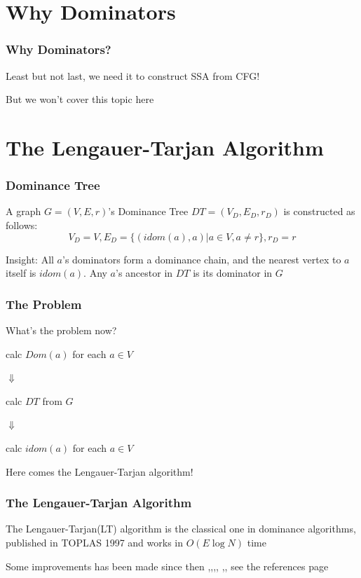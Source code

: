 \documentclass[]{beamer}
\begin{document}
\section{Why Dominators}
\frame{\tableofcontents[currentsection]}

\begin{frame}
  \frametitle{Why Dominators?}
  \centerline{\Large Least but not last, we need it to construct SSA from CFG!}

  \vspace{2em}\pause
  But we won't cover this topic here
\end{frame}

\section{The Lengauer-Tarjan Algorithm}
\frame{\tableofcontents[currentsection]}

\begin{frame}
  \frametitle{Dominance Tree}
  \begin{definition}
    A graph $G=(V, E, r)$'s \alert{Dominance Tree } $DT=(V_D, E_D, r_D)$ is constructed as follows:
    $$V_D=V, E_D=\{ (idom(a), a) | a \in V, a \neq r \}, r_D=r$$
  \end{definition}

  \pause
  Insight: All $a$'s dominators form a dominance chain, and the nearest vertex to $a$ itself is $idom(a)$.
  Any $a$'s ancestor in $DT$ is its dominator in $G$
\end{frame}

\begin{frame}
  \frametitle{The Problem}
  What's the problem now?

  \vspace{1em}\pause
  \centerline{calc $Dom(a)$ for each $a \in V$}
  \centerline{$\Downarrow$}
  \pause
  \centerline{calc $DT$ from $G$}
  \centerline{$\Downarrow$}
  \pause
  \centerline{calc $idom(a)$ for each $a \in V$}

  \vspace{1em}\pause
  Here comes the \alert{Lengauer-Tarjan} algorithm!
\end{frame}

\begin{frame}
  \frametitle{The Lengauer-Tarjan Algorithm}
  The Lengauer-Tarjan(LT) algorithm is the classical one in dominance algorithms,
  published in TOPLAS 1997\cite{Lengauer1979} and works in $O(E \log N)$ time

  \vspace{1em}\pause
  Some improvements has been made since then
  \cite{Harel1985},\cite{Buchsbaum1998a},\cite{Buchsbaum1998},\cite{Alstrup1999},
  \cite{Cooper2001},\cite{Georgiadis2004},
  see the references page
\end{frame}
\end{document}
